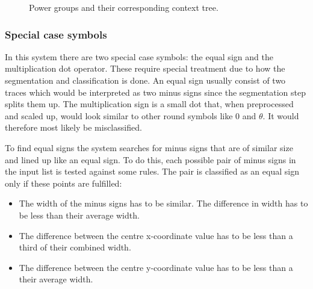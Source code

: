 \begin{figure}[H]
    \caption{Power groups and their corresponding context tree.}
\end{figure}


\subsubsection{Special case symbols}
\label{interpretation-special-symbols}

In this system there are two special case symbols: the equal sign and the multiplication dot operator. These require special treatment due to how the segmentation and classification is done. An equal sign usually consist of two traces which would be interpreted as two minus signs since the segmentation step splits them up. The multiplication sign is a small dot that, when preprocessed and scaled up, would look similar to other round symbols like 0 and $\theta$. It would therefore most likely be misclassified.

To find equal signs the system searches for minus signs that are of similar size and lined up like an equal sign. To do this, each possible pair of minus signs in the input list is tested against some rules. The pair is classified as an equal sign only if these points are fulfilled:

\begin{itemize}
    \setlength\itemsep{0em}
    \item The width of the minus signs has to be similar. The difference in width has to be less than their average width.
    \item The difference between the centre x-coordinate value has to be less than a third of their combined width.
    \item The difference between the centre y-coordinate value has to be less than a their average width.
\end{itemize}


